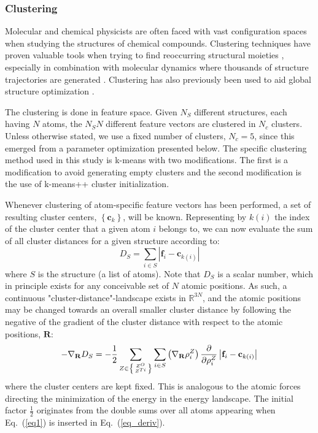 \documentclass[aip,amsmath,amssymb,reprint]{revtex4-1}
\begin{document}
\subsubsection{Clustering}
Molecular and chemical physicists are often faced with vast configuration spaces when studying the structures of chemical compounds. Clustering techniques have proven valuable tools when trying to find reoccurring structural moieties \cite{Gilbert2006}, especially in combination with molecular dynamics where thousands of structure trajectories are generated \cite{Duan2010,Chema2003}. Clustering has also previously been used to aid global structure optimization \cite{Jorgensen2017}.

The clustering is done in feature space. Given $N_S$ different
structures, each having $N$ atoms, the $N_SN$ different feature
vectors are clustered in $N_c$ clusters. Unless otherwise stated, we
use a fixed number of clusters, $N_c=5$, since this emerged from a parameter optimization presented below.
The specific clustering method used in this study is k-means with two
modifications. The first is a modification to avoid generating empty
clusters \cite{Malay2009} and the second modification is the use of
k-means++ cluster initialization\cite{Arthur07k-means-plus-plus}.

Whenever clustering of atom-specific feature vectors has been
performed, a set of resulting cluster centers,
$\left\{\mathbf{c}_k\right\}$, will be known. Representing by $k(i)$ the
index of the cluster center that a given atom $i$ belongs to, we can
now evaluate the sum of all cluster distances for a given structure according to:
\begin{equation}
D_S = \sum_{i \in S} \left|\mathbf f_i- \mathbf c_{k(i)}\right| \label{eq4}
\end{equation}
where $S$ is the structure (a list of atoms). Note that $D_S$ is a
scalar number, which in principle exists for any conceivable set of
$N$ atomic positions. As such, a continuous
"cluster-distance"-landscape exists in $\mathbb{R}^{3N}$, and the
atomic positions may be changed towards an overall smaller cluster
distance by following the negative of the gradient of the cluster distance with
respect to the atomic positions, $\mathbf{R}$:
\begin{equation}\label{eq_deriv}
-\nabla_\mathbf{R} D_S =-\frac{1}{2}\sum_{Z \in \left\{ Z^O \atop Z^{Ti}\right\} }\sum_{i \in S} \left(\nabla_\mathbf{R}\rho_i^Z\right)
\frac{\partial}{\partial\rho_i^Z}\left|\mathbf f_i- \mathbf c_{k(i)}\right|
\end{equation}
where the cluster centers are kept fixed. This is analogous to the
atomic forces directing the minimization of the energy in the energy
landscape. The initial factor $\frac{1}{2}$ originates from the double sums over all atoms appearing when Eq.\ (\ref{eq1}) is inserted in Eq.\ (\ref{eq_deriv}).
\end{document}

